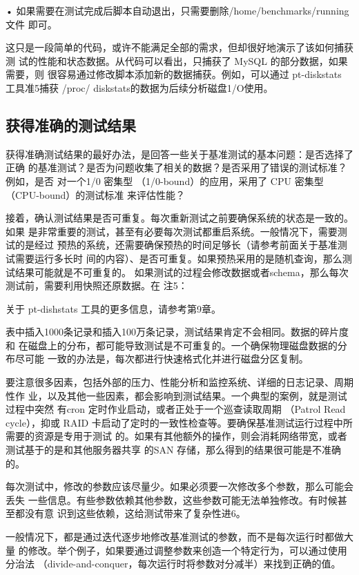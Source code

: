 • 如果需要在测试完成后脚本自动退出，只需要删除/home/benchmarks/running 文件
即可。

这只是一段简单的代码，或许不能满足全部的需求，但却很好地演示了该如何捕获测
试的性能和状态数据。从代码可以看出，只捕获了 MySQL 的部分数据，如果需要，则
很容易通过修改脚本添加新的数据捕获。例如，可以通过 pt-diskstats 工具准5捕获 /proc/
diskstats的数据为后续分析磁盘1/O使用。

\subsection{获得准确的测试结果}
获得准确测试结果的最好办法，是回答一些关于基准测试的基本问题：是否选择了正确
的基准测试？是否为问题收集了相关的数据？是否采用了错误的测试标准？例如，是否
对一个1/0 密集型 （1/0-bound）的应用，采用了 CPU 密集型（CPU-bound）的测试标准
来评估性能？

接着，确认测试结果是否可重复。每次重新测试之前要确保系统的状态是一致的。如果
是非常重要的测试，甚至有必要每次测试都重启系统。一般情况下，需要测试的是经过
预热的系统，还需要确保预热的时间足够长（请参考前面关于基准测试需要运行多长时
间的内容）、是否可重复。如果预热采用的是随机查询，那么测试结果可能就是不可重复的。
如果测试的过程会修改数据或者schema，那么每次测试前，需要利用快照还原数据。在
注5：

关于 pt-dishstats 工具的更多信息，请参考第9章。

表中插入1000条记录和插入100万条记录，测试结果肯定不会相同。数据的碎片度和
在磁盘上的分布，都可能导致测试是不可重复的。一个确保物理磁盘数据的分布尽可能
一致的办法是，每次都进行快速格式化并进行磁盘分区复制。

要注意很多因素，包括外部的压力、性能分析和监控系统、详细的日志记录、周期性作
业，以及其他一些因素，都会影响到测试结果。一个典型的案例，就是测试过程中突然
有cron 定时作业启动，或者正处于一个巡查读取周期 （Patrol Read cycle），抑或 RAID
卡启动了定时的一致性检查等。要确保基准测试运行过程中所需要的资源是专用于测试
的。如果有其他额外的操作，则会消耗网络带宽，或者测试基于的是和其他服务器共享
的SAN 存储，那么得到的结果很可能是不准确的。

每次测试中，修改的参数应该尽量少。如果必须要一次修改多个参数，那么可能会丢失
一些信息。有些参数依赖其他参数，这些参数可能无法单独修改。有时候甚至都没有意
识到这些依赖，这给测试带来了复杂性进6。

一般情况下，都是通过迭代逐步地修改基准测试的参数，而不是每次运行时都做大量
的修改。举个例子，如果要通过调整参数来创造一个特定行为，可以通过使用分治法
（divide-and-conquer，每次运行时将参数对分减半）来找到正确的值。


